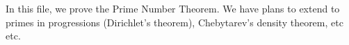 

In this file, we prove the Prime Number Theorem. We have plans to extend to primes in progressions (Dirichlet's theorem), Chebytarev's density theorem, etc etc.




